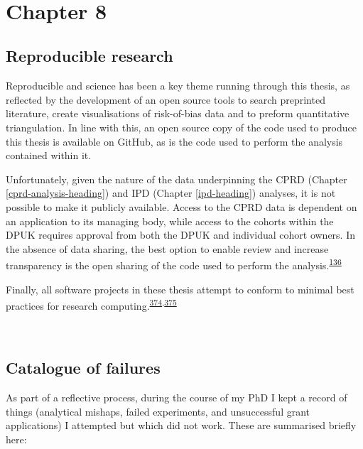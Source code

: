 \documentclass[a4paper, twoside]{templates/ociamthesis}
\begin{document}
~

\hypertarget{chapter-8}{%
\section{Chapter 8}\label{chapter-8}}

\hypertarget{disc-repro-research}{%
\subsection{Reproducible research}\label{disc-repro-research}}

Reproducible and science has been a key theme running through this thesis, as reflected by the development of an open source tools to search preprinted literature, create visualisations of risk-of-bias data and to preform quantitative triangulation. In line with this, an open source copy of the code used to produce this thesis is available on GitHub, as is the code used to perform the analysis contained within it.

Unfortunately, given the nature of the data underpinning the CPRD (Chapter \ref{cprd-analysis-heading}) and IPD (Chapter \ref{ipd-heading}) analyses, it is not possible to make it publicly available. Access to the CPRD data is dependent on an application to its managing body, while access to the cohorts within the DPUK requires approval from both the DPUK and individual cohort owners. In the absence of data sharing, the best option to enable review and increase transparency is the open sharing of the code used to perform the analysis.\textsuperscript{\protect\hyperlink{ref-goldacre2019}{136}}

Finally, all software projects in these thesis attempt to conform to minimal best practices for research computing.\textsuperscript{\protect\hyperlink{ref-wilson2014}{374},\protect\hyperlink{ref-wilson2017}{375}}

~

\hypertarget{appendix-catalogue-failures}{%
\subsection{Catalogue of failures}\label{appendix-catalogue-failures}}

As part of a reflective process, during the course of my PhD I kept a record of things (analytical mishaps, failed experiments, and unsuccessful grant applications) I attempted but which did not work. These are summarised briefly here:
\end{document}
